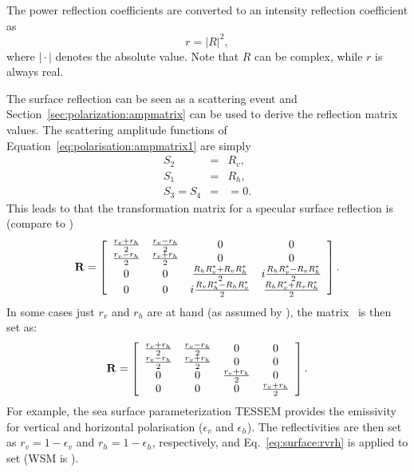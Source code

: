 The power reflection coefficients are converted to an intensity
 reflection coefficient as
 \begin{equation}
   \label{eq:surface:R2r}
   r = |R|^2,
 \end{equation}
 where $|\!\cdot\!|$ denotes the absolute value. Note that $R$ can be
 complex, while $r$ is always real.

The surface reflection can be seen as a scattering event and
Section~\ref{sec:polarization:ampmatrix} can be used to derive the
reflection matrix values. The scattering amplitude functions of
Equation~\ref{eq:polarisation:ampmatrix1} are simply
\begin{eqnarray}
  S_2 &=& R_v, \\
  S_1 &=& R_h, \\
  S_3 = S_4 &=& =0.
\end{eqnarray}
This leads to that the transformation matrix for a specular surface
reflection is (compare to \citet[Sec.\ 5.4.3]{liou:02})
\begin{equation}
  \label{eq:surface:specular_matrix}
  \mathbf{R} =
     \left[\begin{array}{cccc}
       \frac{r_v+r_h}{2}&\frac{r_v-r_h}{2}&0&0\\
       \frac{r_v-r_h}{2}&\frac{r_v+r_h}{2}&0&0\\
    0&0&\frac{R_hR_v^\ast+R_vR_h^\ast}{2}&i\frac{R_hR_v^\ast-R_vR_h^\ast}{2}\\
    0&0&i\frac{R_vR_h^\ast-R_hR_v^\ast}{2}&\frac{R_hR_v^\ast+R_vR_h^\ast}{2}\\
     \end{array}
     \right].
\end{equation}
In some cases just $r_v$ and $r_h$ are at hand (as assumed by
), the matrix \ is then
set as:
\begin{equation}
  \label{eq:surface:rvrh}
  \mathbf{R} =
     \left[\begin{array}{cccc}
       \frac{r_v+r_h}{2}&\frac{r_v-r_h}{2}&0&0\\
       \frac{r_v-r_h}{2}&\frac{r_v+r_h}{2}&0&0\\
    0&0&\frac{r_v+r_h}{2}&0\\
    0&0&0&\frac{r_v+r_h}{2}\\
     \end{array}
     \right].
\end{equation}
For example, the sea surface parameterization TESSEM provides the emissivity
for vertical and horizontal polarisation ($\epsilon_v$ and $\epsilon_h$). The
reflectivities are then set as $r_v=1-\epsilon_v$ and $r_h=1-\epsilon_h$,
respectively, and Eq.~\ref{eq:surface:rvrh} is applied to set 
(WSM is ).

